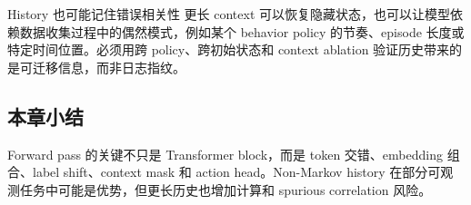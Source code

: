 
\begin{warningbox}{History 也可能记住错误相关性}
更长 context 可以恢复隐藏状态，也可以让模型依赖数据收集过程中的偶然模式，例如某个 behavior policy 的节奏、episode 长度或特定时间位置。必须用跨 policy、跨初始状态和 context ablation 验证历史带来的是可迁移信息，而非日志指纹。
\end{warningbox}

\subsection{本章小结}

Forward pass 的关键不只是 Transformer block，而是 token 交错、embedding 组合、label shift、context mask 和 action head。Non-Markov history 在部分可观测任务中可能是优势，但更长历史也增加计算和 spurious correlation 风险。


